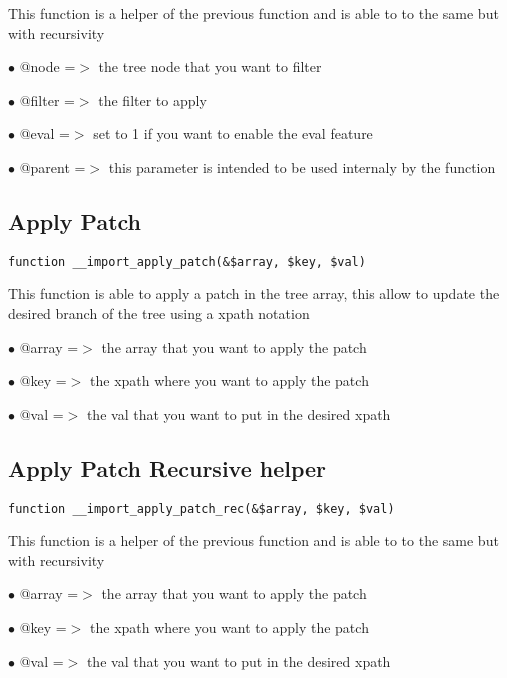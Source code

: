 \documentclass[a4paper]{book}
\begin{document}
This function is a helper of the previous function and is able to to the
same but with recursivity

\begin{compactitem}
\item[\color{myblue}$\bullet$] @node   =$>$ the tree node that you want to filter
\item[\color{myblue}$\bullet$] @filter =$>$ the filter to apply
\item[\color{myblue}$\bullet$] @eval   =$>$ set to 1 if you want to enable the eval feature
\item[\color{myblue}$\bullet$] @parent =$>$ this parameter is intended to be used internaly by the function
\end{compactitem}

\hypertarget{toc182}{}
\subsection{Apply Patch}

\begin{lstlisting}
function __import_apply_patch(&$array, $key, $val)
\end{lstlisting}

This function is able to apply a patch in the tree array, this allow to
update the desired branch of the tree using a xpath notation

\begin{compactitem}
\item[\color{myblue}$\bullet$] @array =$>$ the array that you want to apply the patch
\item[\color{myblue}$\bullet$] @key   =$>$ the xpath where you want to apply the patch
\item[\color{myblue}$\bullet$] @val   =$>$ the val that you want to put in the desired xpath
\end{compactitem}

\hypertarget{toc183}{}
\subsection{Apply Patch Recursive helper}

\begin{lstlisting}
function __import_apply_patch_rec(&$array, $key, $val)
\end{lstlisting}

This function is a helper of the previous function and is able to to the
same but with recursivity

\begin{compactitem}
\item[\color{myblue}$\bullet$] @array =$>$ the array that you want to apply the patch
\item[\color{myblue}$\bullet$] @key   =$>$ the xpath where you want to apply the patch
\item[\color{myblue}$\bullet$] @val   =$>$ the val that you want to put in the desired xpath
\end{compactitem}
\end{document}
